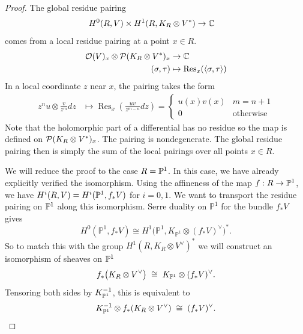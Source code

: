 \documentclass[12pt]{article}
\begin{document}
\begin{proof}
    The global residue pairing \begin{align*}
        H^0(R, V) \times H^1(R, K_R \otimes V^*) & \to \C
    \end{align*} comes from a local residue pairing at a point $x\in R$. \begin{align*}
        \cO(V)_x \otimes \cP(K_R \otimes V^*)_x & \to \C                                                     \\
        (\sigma, \tau)                          & \mapsto \operatorname{Res}_x(\langle \sigma, \tau \rangle)
    \end{align*} In a local coordinate $z$ near $x$, the pairing takes the form \begin{align*}
        z^n u \otimes \frac{v}{z^m} dz & \mapsto \operatorname{Res}_x \left( \frac{u v}{z^{m-n}} dz \right) = \begin{cases}
                                                                                                                  u(x)v(x) & m = n+1          \\
                                                                                                                  0        & \text{otherwise}
                                                                                                              \end{cases}
    \end{align*}
    Note that the holomorphic part of a differential has no residue so the map is defined on $\cP(K_R \otimes V^*)_x$. The pairing is nondegenerate. The global residue pairing then is simply the sum of the local pairings over all points $x \in R$.

    We will reduce the proof to the case $R = \P^1$. In this case, we have already explicitly verified the isomorphism. Using the affineness of the map $f: R \to \P^1$, we have $H^i(R, V) = H^i(\P^1, f_*V)$ for $i=0,1$. We want to transport the residue pairing on $\P^1$ along this isomorphism. Serre duality on $\mathbb P^1$ for the bundle $f_*V$ gives
    \[
        H^0(\mathbb P^1,f_*V)\cong H^1\bigl(\mathbb P^1,K_{\mathbb P^1}\otimes (f_*V)^\vee\bigr)^*.
    \]
    So to match this with the group
    $H^1(R,K_R\otimes V^\vee)^*$
    we will construct an isomorphism of sheaves on $\P^1$
    \begin{equation}\label{eq:target-duality}
        f_*\bigl(K_R\otimes V^\vee\bigr)
        \;\cong\;
        K_{\P^1}\otimes (f_*V)^\vee.
    \end{equation}
    Tensoring both sides by $K_{\P^1}^{-1}$, this is equivalent to
    \begin{equation}\label{eq:step1}
        K_{\P^1}^{-1}\otimes f_*(K_R\otimes V^\vee)
        \;\cong\;
        (f_*V)^\vee.
    \end{equation}


\end{proof}
\end{document}
